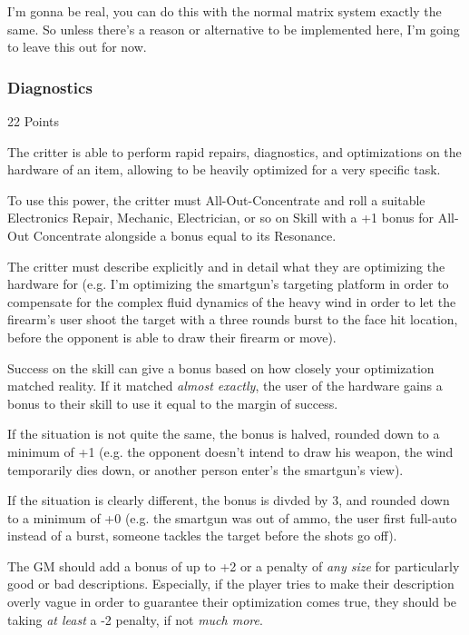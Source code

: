 \begin{multicols*}{3}
	I'm gonna be real, you can do this with the normal matrix system exactly the same. So unless there's a reason or alternative to be implemented here, I'm going to leave this out for now.

	\subsubsection{Diagnostics}\label{diagnostics}
	\begin{flushright}
		22 Points
	\end{flushright}

	The critter is able to perform rapid repairs, diagnostics, and optimizations on the hardware of an item, allowing to be heavily optimized for a very specific task.
	
	To use this power, the critter must All-Out-Concentrate and roll a suitable Electronics Repair, Mechanic, Electrician, or so on Skill with a +1 bonus for All-Out Concentrate alongside a bonus equal to its Resonance. 
	
	The critter must describe explicitly and in detail what they are optimizing the hardware for (e.g. I'm optimizing the smartgun's targeting platform in order to compensate for the complex fluid dynamics of the heavy wind in order to let the firearm's user shoot the target with a three rounds burst to the face hit location, before the opponent is able to draw their firearm or move). 
	
	Success on the skill can give a bonus based on how closely your optimization matched reality. If it matched \textit{almost exactly}, the user of the hardware gains a bonus to their skill to use it equal to the margin of success. 
	
	If the situation is not quite the same, the bonus is halved, rounded down to a minimum of +1 (e.g. the opponent doesn't intend to draw his weapon, the wind temporarily dies down, or another person enter's the smartgun's view). 
	
	If the situation is clearly different, the bonus is divded by 3, and rounded down to a minimum of +0 (e.g. the smartgun was out of ammo, the user first full-auto instead of a burst, someone tackles the target before the shots go off).
	
	The GM should add a bonus of up to +2 or a penalty of \textit{any size} for particularly good or bad descriptions. Especially, if the player tries to make their description overly vague in order to guarantee their optimization comes true, they should be taking \textit{at least} a -2 penalty, if not \textit{much more}.


\end{multicols*}
